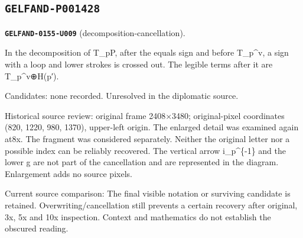 \subsection*{\texttt{GELFAND-P001428}}
\par\noindent\leavevmode{}\label{GELFAND-0155-U009}\label{GELFAND-P001428:decomposition-cancellation}\textbf{\texttt{GELFAND-0155-U009}} (decomposition-cancellation).\nopagebreak[4]\par
In the decomposition of T\_pP, after the equals sign and before T\_p\textasciicircum{}v, a sign with a loop and lower strokes is crossed out. The legible terms after it are T\_p\textasciicircum{}v⊕H(p′).\par
Candidates: none recorded. Unresolved in the diplomatic source.\par
Historical source review: original frame 2408×3480; original-pixel coordinates (820, 1220, 980, 1370), upper-left origin. The enlarged detail was examined again at8x. The fragment was considered separately. Neither the original letter nor a possible index can be reliably recovered. The vertical arrow i\_p\textasciicircum{}\{-1\} and the lower g are not part of the cancellation and are represented in the diagram. Enlargement adds no source pixels.\par
Current source comparison: The final visible notation or surviving candidate is retained. Overwriting/cancellation still prevents a certain recovery after original, 3x, 5x and 10x inspection. Context and mathematics do not establish the obscured reading.\par
\medskip
